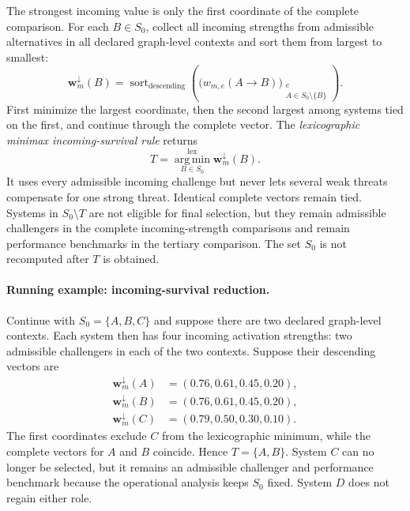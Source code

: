 \documentclass[11pt]{article}
\theoremstyle{remark}
\begin{document}
The strongest incoming value is only the first coordinate of the complete
comparison. For each $B\in S_0$, collect all incoming strengths from admissible
alternatives in all declared graph-level contexts and sort them from largest to
smallest:
\begin{equation}
\mathbf w_m^{\downarrow}(B)
=
\operatorname{sort}_{\mathrm{descending}}
\left(
\bigl(w_{m,e}(A\to B)\bigr)_{
\substack{e\\A\in S_0\setminus\{B\}}}
\right).
\label{eq:incoming-survival-vector}
\end{equation}
First minimize the largest coordinate, then the second largest among systems
tied on the first, and continue through the complete vector. The
\emph{lexicographic minimax incoming-survival rule} returns
\begin{equation}
T
=
\operatorname*{arg\,min}^{\mathrm{lex}}_{B\in S_0}
\mathbf w_m^{\downarrow}(B).
\label{eq:incoming-survival-selection}
\end{equation}
It uses every admissible incoming challenge but never lets several weak threats
compensate for one strong threat. Identical complete vectors remain tied.
Systems in $S_0\setminus T$ are not eligible for final selection, but they
remain admissible challengers in the complete incoming-strength comparisons
and remain performance benchmarks in the tertiary comparison. The set $S_0$
is not recomputed after $T$ is obtained.

\paragraph{Running example: incoming-survival reduction.}
Continue with $S_0=\{A,B,C\}$ and suppose there are two declared graph-level
contexts. Each system then has four incoming activation strengths: two
admissible challengers in each of the two contexts. Suppose their descending
vectors are
\[
\begin{aligned}
\mathbf w_m^{\downarrow}(A)&=(0.76,0.61,0.45,0.20),\\
\mathbf w_m^{\downarrow}(B)&=(0.76,0.61,0.45,0.20),\\
\mathbf w_m^{\downarrow}(C)&=(0.79,0.50,0.30,0.10).
\end{aligned}
\]
The first coordinates exclude $C$ from the lexicographic minimum, while the
complete vectors for $A$ and $B$ coincide. Hence $T=\{A,B\}$. System $C$ can
no longer be selected, but it remains an admissible challenger and performance
benchmark because the operational analysis keeps $S_0$ fixed. System $D$ does
not regain either role.
\end{document}
